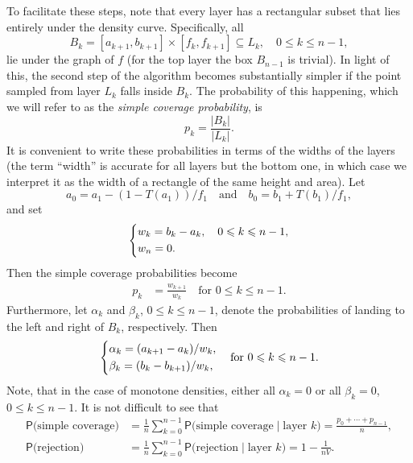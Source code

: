 \documentclass{article}
\renewcommand{\leq}{\leqslant}
\renewcommand{\Pr}{\mathsf{P}}
\theoremstyle{definition} %
\begin{document}
To facilitate these steps, note that every layer has a rectangular subset that lies entirely under the density curve. Specifically, all
\[
    B_k = [a_{k + 1} , b_{k + 1}] \times [f_k, f_{k + 1}] \subseteq L_k, \quad 0 \leq k \leq n - 1,
\]
lie under the graph of $f$ (for the top layer the box $B_{n - 1}$ is trivial).
In light of this, the second step of the algorithm becomes substantially simpler if the point sampled from layer $L_k$ falls inside $B_k$. The probability of this happening, which we will refer to as the \emph{simple coverage probability}, is
\[
    p_k = \frac{|B_k|}{|L_k|}.
\]
It is convenient to write these probabilities in terms of the widths of the layers (the term ``width'' is accurate for all layers but the bottom one, in which case we interpret it as the width of a rectangle of the same height and area). Let
\[
    a_0 = a_1 - (1 - T(a_1)) / f_1
    \quad \text{and} \quad
    b_0 = b_1 + T(b_1) / f_1,
\]
and set
\begin{align} \label{eq:layer_width}
    \begin{dcases}
        w_k = b_k - a_k, \quad 0 \leq k \leq n - 1, \\
        w_n = 0.
    \end{dcases}
\end{align}
Then the simple coverage probabilities become
\begin{align} \label{eq:simple_coverage_probability}
    p_k &= \frac{w_{k + 1}}{w_{k}} \quad \text{for $0 \leq k \leq n - 1$}.
\end{align}
%
Furthermore, let $\alpha _k$ and $\beta _k$, $0 \leq k \leq n - 1$, denote the probabilities of landing to the left and right of $B_k$, respectively. Then
\begin{align} \label{eq:fallout_probability}
    \begin{dcases}
        \alpha _k = (a_{k + 1} - a_{k}) / w_k, \\
        \beta _k = (b_{k} - b_{k + 1}) / w_k,
    \end{dcases}
    \quad \text{for $0 \leq k \leq n - 1$}.
\end{align}
Note, that in the case of monotone densities, either all $\alpha _k = 0$ or all $\beta _k = 0$, $0 \leq k \leq n - 1$.
%
It is not difficult to see that
\begin{align*}
    \Pr \big(\text{simple coverage}\big) &= \frac{1}{n} \sum _{k = 0} ^{n - 1} \Pr \big(\text{simple coverage} \mid \text{layer $k$}\big)
        = \frac{p_0 + \cdots + p_{n - 1}}{n}, \\
    \Pr \big(\text{rejection}\big) &= \frac{1}{n} \sum _{k = 0} ^{n - 1} \Pr \big(\text{rejection} \mid \text{layer $k$}\big)
        = 1 - \frac{1}{n V}.
\end{align*}
\end{document}
